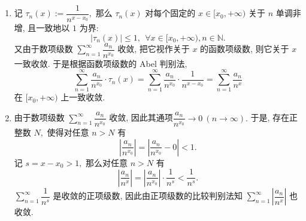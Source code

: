 \begin{solution}
\begin{enumerate}
\item 记 $\tau_n(x) := \dfrac{1}{n^{x-x_0}},$ 那么 $\tau_n(x)$ 对每个固定的 $x \in [x_0, +\infty)$ 关于 $n$ 单调非增, 且一致地以 $1$ 为界:
\[\lvert \tau_n(x) \rvert \leqslant 1, ~~ \forall x \in [x_0, +\infty), n \in \mathbb{N}.\]
又由于数项级数 $\sum\limits_{n=1}^\infty \dfrac{a_n}{n^{x_0}}$ 收敛, 把它视作关于 $x$ 的函数项级数, 则它关于 $x$ 一致收敛. 于是根据函数项级数的 Abel 判别法,
\[\sum\limits_{n=1}^\infty \dfrac{a_n}{n^{x_0}} \cdot \tau_n(x) = \sum\limits_{n=1}^\infty \dfrac{a_n}{n^{x_0}} \cdot \dfrac{1}{n^{x-x_0}} = \sum\limits_{n=1}^\infty \dfrac{a_n}{n^{x}}\]
在 $[x_0, +\infty)$ 上一致收敛.
\item 由于数项级数 $\sum\limits_{n=1}^\infty \dfrac{a_n}{n^{x_0}}$ 收敛, 因此其通项$\dfrac{a_n}{n^{x_0}} \to 0 ~ (n\to\infty).$ 于是, 存在正整数 $N,$ 使得对任意 $n > N$ 有
\[\left\lvert \dfrac{a_n}{n^{x_0}} \right\rvert = \left\lvert \dfrac{a_n}{n^{x_0}} - 0 \right\rvert < 1.\]
记 $s = x - x_0 > 1,$ 那么对任意 $n > N$ 有
\[\left\lvert \dfrac{a_n}{n^x} \right\rvert = \left\lvert \dfrac{a_n}{n^{x_0}} \right\rvert \cdot \dfrac{1}{n^s} < \dfrac{1}{n^s}.\]
$\sum\limits_{n=1}^\infty \dfrac{1}{n^s}$ 是收敛的正项级数, 因此由正项级数的比较判别法知 $\sum\limits_{n=1}^\infty \left\lvert \dfrac{a_n}{n^{x}} \right\rvert$ 也收敛.
\end{enumerate}
\end{solution}

